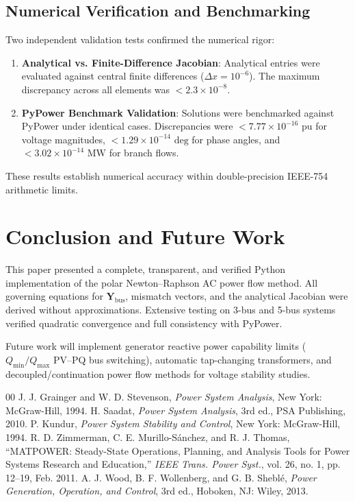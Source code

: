 ﻿\documentclass[conference,10pt]{IEEEtran}
\begin{document}
\subsection{Numerical Verification and Benchmarking}
Two independent validation tests confirmed the numerical rigor:
\begin{enumerate}
    \item \textbf{Analytical vs. Finite-Difference Jacobian}: Analytical entries were evaluated against central finite differences ($\Delta x = 10^{-6}$). The maximum discrepancy across all elements was $< 2.3 \times 10^{-8}$.
    \item \textbf{PyPower Benchmark Validation}: Solutions were benchmarked against PyPower under identical cases. Discrepancies were $< 7.77 \times 10^{-16}\text{ pu}$ for voltage magnitudes, $< 1.29 \times 10^{-14}\text{ deg}$ for phase angles, and $< 3.02 \times 10^{-14}\text{ MW}$ for branch flows.
\end{enumerate}
These results establish numerical accuracy within double-precision IEEE-754 arithmetic limits.

\section{Conclusion and Future Work}
This paper presented a complete, transparent, and verified Python implementation of the polar Newton--Raphson AC power flow method. All governing equations for $\mathbf{Y}_{\text{bus}}$, mismatch vectors, and the analytical Jacobian were derived without approximations. Extensive testing on 3-bus and 5-bus systems verified quadratic convergence and full consistency with PyPower.

Future work will implement generator reactive power capability limits ($Q_{\text{min}}/Q_{\text{max}}$ PV--PQ bus switching), automatic tap-changing transformers, and decoupled/continuation power flow methods for voltage stability studies.

\begin{thebibliography}{00}
 J. J. Grainger and W. D. Stevenson, \textit{Power System Analysis}, New York: McGraw-Hill, 1994.
 H. Saadat, \textit{Power System Analysis}, 3rd ed., PSA Publishing, 2010.
 P. Kundur, \textit{Power System Stability and Control}, New York: McGraw-Hill, 1994.
 R. D. Zimmerman, C. E. Murillo-S\'{a}nchez, and R. J. Thomas, ``MATPOWER: Steady-State Operations, Planning, and Analysis Tools for Power Systems Research and Education,'' \textit{IEEE Trans. Power Syst.}, vol. 26, no. 1, pp. 12--19, Feb. 2011.
 A. J. Wood, B. F. Wollenberg, and G. B. Shebl\'{e}, \textit{Power Generation, Operation, and Control}, 3rd ed., Hoboken, NJ: Wiley, 2013.
\end{thebibliography}
\end{document}
